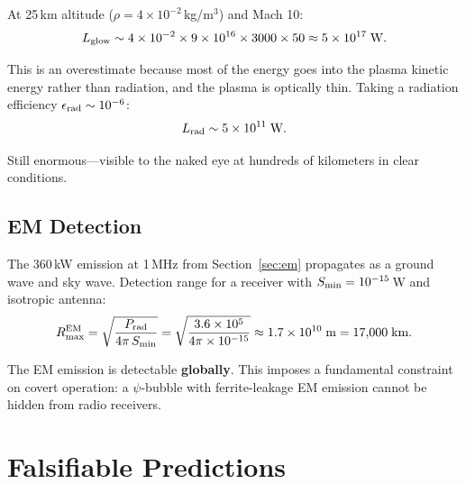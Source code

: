 \documentclass[11pt]{article}
\begin{document}
At 25\,km altitude ($\rho = 4 \times 10^{-2}$\,kg/m$^3$) and Mach 10:
\begin{equation}
L_{\rm glow} \sim 4 \times 10^{-2} \times 9 \times 10^{16}
  \times 3000 \times 50
  \approx 5 \times 10^{17}\;\text{W}.
\end{equation}

This is an overestimate because most of the energy goes into the
plasma kinetic energy rather than radiation, and the plasma is optically
thin. Taking a radiation efficiency $\epsilon_{\rm rad} \sim 10^{-6}$:
\begin{equation}
L_{\rm rad} \sim 5 \times 10^{11}\;\text{W}.
\end{equation}

Still enormous---visible to the naked eye at hundreds of kilometers in
clear conditions.

\subsection{EM Detection}

The 360\,kW emission at 1\,MHz from Section~\ref{sec:em} propagates as
a ground wave and sky wave. Detection range for a receiver with
$S_{\rm min} = 10^{-15}$\,W and isotropic antenna:
\begin{equation}
R_{\max}^{\rm EM} = \sqrt{\frac{P_{\rm rad}}{4\pi\,S_{\rm min}}}
  = \sqrt{\frac{3.6 \times 10^5}{4\pi \times 10^{-15}}}
  \approx 1.7 \times 10^{10}\;\text{m} = 17{,}000\;\text{km}.
\end{equation}

The EM emission is detectable \textbf{globally}. This imposes a
fundamental constraint on covert operation: a $\psi$-bubble with
ferrite-leakage EM emission cannot be hidden from radio receivers.


\section{Falsifiable Predictions}\label{sec:falsifiable}
\end{document}
